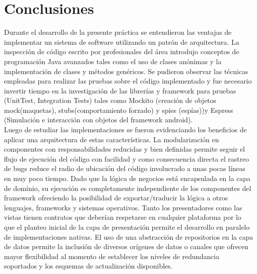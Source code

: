 
\chapter{Conclusiones} %

\label{Chapter4} %


Durante el desarrollo de la presente práctica se entendieron las ventajas de implementar un sistema de software utilizando un patrón de arquitectura. La inspección de código escrito por profesionales del área introdujo conceptos de programación Java avanzados tales como el uso de clases anónimas \cite{anon_pankaj} y la implementación de clases y métodos genéricos\cite{gen_caules}. Se pudieron observar las técnicas empleadas para realizar las pruebas sobre el código implementado y fue necesario invertir tiempo en la investigación de las librerías y framework para pruebas (UnitTest, Integration Tests) tales como Mockito \cite{mockito_lars} (creación de objetos mock(maquetas), stubs(comportamiento forzado) y spies (espías))y Espress \cite{espress_maksim} (Simulación e interacción con objetos del framework android).\\
Luego de estudiar las implementaciones se fueron evidenciando los beneficios de aplicar una arquitectura de estas características. La modularización en componentes con responsabilidades reducidas y bien definidas permite seguir el flujo de ejecución del código con facilidad y como consecuencia directa el rastreo de bugs reduce el radio de ubicación del código involucrado a unas pocas líneas en muy poco tiempo.
Dado que la lógica de negocios está encapsulada en la capa de dominio, su ejecución es completamente independiente de los componentes del framework ofreciendo la posibilidad de exportar/traducir la lógica a otros lenguajes, frameworks y sistemas operativos.
Tanto los presentadores como las vistas tienen contratos que deberían respetarse en cualquier plataforma por lo que el planteo inicial de la capa de presentación permite el desarrollo en paralelo de implementaciones nativas.
El uso de una abstracción de repositorios en la capa de datos permite la inclusión de diversos orígenes de datos o canales que ofrecen mayor flexibilidad al momento de establecer los niveles de redundancia soportados y los esquemas de actualización disponibles. 
